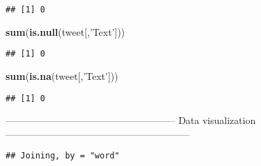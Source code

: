 \documentclass[
]{article}
\newenvironment{Shaded}{\begin{snugshade}}{\end{snugshade}}
\newcommand{\CommentTok}[1]{\textcolor[rgb]{0.56,0.35,0.01}{\textit{#1}}}
\newcommand{\KeywordTok}[1]{\textcolor[rgb]{0.13,0.29,0.53}{\textbf{#1}}}
\newcommand{\NormalTok}[1]{#1}
\newcommand{\OperatorTok}[1]{\textcolor[rgb]{0.81,0.36,0.00}{\textbf{#1}}}
\newcommand{\StringTok}[1]{\textcolor[rgb]{0.31,0.60,0.02}{#1}}
\begin{document}
\begin{verbatim}
## [1] 0
\end{verbatim}

\begin{Shaded}
\begin{Highlighting}[]
\KeywordTok{sum}\NormalTok{(}\KeywordTok{is.null}\NormalTok{(tweet[,}\StringTok{'Text'}\NormalTok{]))}
\end{Highlighting}
\end{Shaded}

\begin{verbatim}
## [1] 0
\end{verbatim}

\begin{Shaded}
\begin{Highlighting}[]
\KeywordTok{sum}\NormalTok{(}\KeywordTok{is.na}\NormalTok{(tweet[,}\StringTok{'Text'}\NormalTok{]))}
\end{Highlighting}
\end{Shaded}

\begin{verbatim}
## [1] 0
\end{verbatim}

----------------------------------------------------- Data visualization
---------------------------------------------------------

\begin{Shaded}
\end{Shaded}

\begin{verbatim}
## Joining, by = "word"
\end{verbatim}
\end{document}
